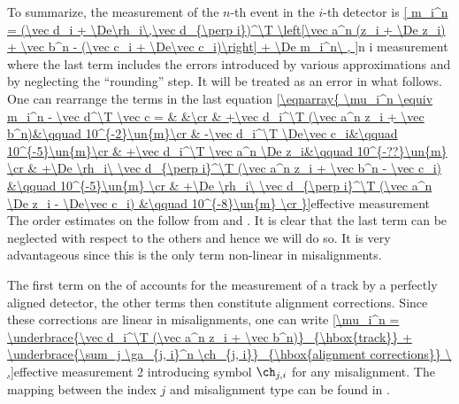 To summarize, the measurement of the $n$-th event in the $i$-th detector is
\eqref{
m_i^n = (\vec d_i + \De\rh_i\,\vec d_{\perp i})^\T \left[\vec a^n (z_i + \De z_i) + \vec b^n - (\vec c_i + \De\vec c_i)\right] + \De m_i^n\ ,
}{n i measurement}
where the last term includes the errors introduced by various approximations and by neglecting the ``rounding'' step. It will be treated as an error in what follows. One can rearrange the terms in the last equation
\eqref{\eqnarray{
\mu_i^n \equiv m_i^n - \vec d^\T \vec c = & &\cr
& +\vec d_i^\T (\vec a^n z_i + \vec b^n)&\qquad 10^{-2}\un{m}\cr
& -\vec d_i^\T \De\vec c_i&\qquad 10^{-5}\un{m}\cr
& +\vec d_i^\T \vec a^n \De z_i&\qquad 10^{-??}\un{m} \cr
& +\De \rh_i\ \vec d_{\perp i}^\T (\vec a^n z_i + \vec b^n - \vec c_i) &\qquad 10^{-5}\un{m} \cr
& +\De \rh_i\ \vec d_{\perp i}^\T (\vec a^n \De z_i - \De\vec c_i) &\qquad 10^{-8}\un{m} \cr
}}{effective measurement}
The order estimates on the \rhs{} follow from  and . It is clear that the last term can be neglected with respect to the others and hence we will do so. It is very advantageous since this is the only term non-linear in misalignments. 

The first term on the \rhs{} of  accounts for the measurement of a track by a perfectly aligned detector, the other terms then constitute alignment corrections. Since these corrections are linear in misalignments, one can write
\eqref{\mu_i^n =
\underbrace{\vec d_i^\T (\vec a^n z_i + \vec b^n)}_{\hbox{track}}
+
\underbrace{\sum_j \ga_{j, i}^n \ch_{j, i}}_{\hbox{alignment corrections}}
\ ,}{effective measurement 2}
introducing symbol $\ch_{j, i}$ for any misalignment. The mapping between the index $j$ and misalignment type can be found in .


